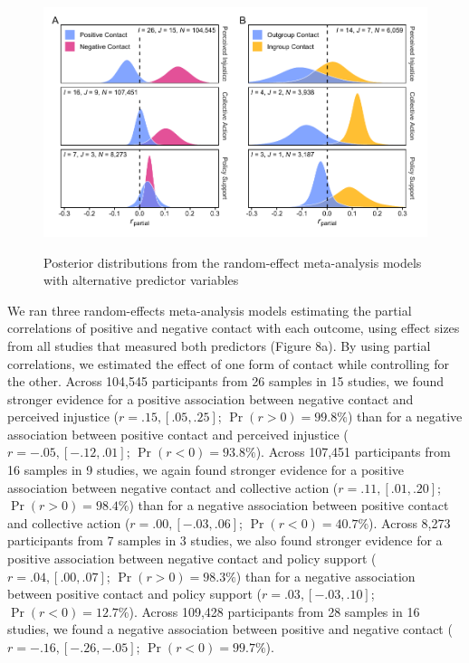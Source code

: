 \documentclass[twocolumn, 11pt, letterpaper]{article}
\begin{document}
\begin{figure}
\centering
\caption{Posterior distributions from the random-effect meta-analysis models with alternative predictor variables}
\includegraphics[scale=1]{../figures/figure-8}
\label{fig:f8}
\end{figure}

We ran three random-effects meta-analysis models estimating the partial
correlations of positive and negative contact with each outcome, using
effect sizes from all studies that measured both predictors (Figure 8a).
By using partial correlations, we estimated the effect of one form of
contact while controlling for the other. Across 104,545 participants
from 26 samples in 15 studies, we found stronger evidence for a positive
association between negative contact and perceived injustice
(\(r = .15, [.05, .25]\); \(\Pr (r > 0) = 99.8\%\)) than for a negative
association between positive contact and perceived injustice
(\(r = -.05, [-.12, .01]\); \(\Pr (r < 0) = 93.8\%\)). Across 107,451
participants from 16 samples in 9 studies, we again found stronger
evidence for a positive association between negative contact and
collective action (\(r = .11, [.01, .20]\); \(\Pr (r > 0) = 98.4\%\))
than for a negative association between positive contact and collective
action (\(r = .00, [-.03, .06]\); \(\Pr (r < 0) = 40.7\%\)). Across
8,273 participants from 7 samples in 3 studies, we also found stronger
evidence for a positive association between negative contact and policy
support (\(r = .04, [.00, .07]\); \(\Pr (r > 0) = 98.3\%\)) than for a
negative association between positive contact and policy support
(\(r = .03, [-.03, .10]\); \(\Pr (r < 0) = 12.7\%\)). Across 109,428
participants from 28 samples in 16 studies, we found a negative
association between positive and negative contact
(\(r = -.16, [-.26, -.05]\); \(\Pr (r < 0) = 99.7\%\)).
\end{document}
